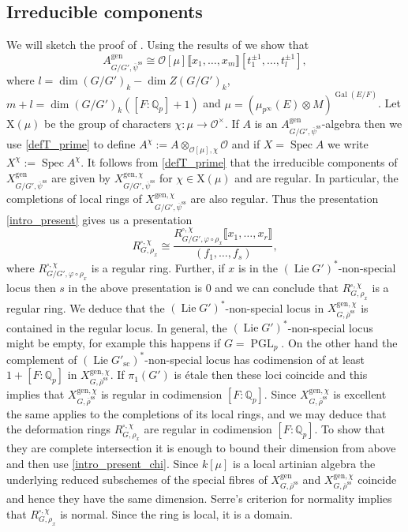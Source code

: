 \documentclass{amsart}
\theoremstyle{definition}
\theoremstyle{remark}
\DeclareMathOperator{\Gal}{Gal}
\DeclareMathOperator{\Spec}{Spec}
\newcommand{\Qp}{\mathbb {Q}_p}
\newcommand{\OO}{\mathcal O}
\newcommand{\br}[1]{\llbracket #1\rrbracket}
\newcommand{\rhobar}{\overline{\rho}}
\newcommand{\gen}{\mathrm{gen}}
\DeclareMathOperator{\PGL}{PGL}
\DeclareMathOperator{\Lie}{Lie}
\newcommand{\rhobarss}{\rhobar^{\mathrm{ss}}}
\newcommand{\psibar}{\overline{\psi}}
\newcommand{\psibarss}{\psibar^{\mathrm {ss}}}
\newcommand{\sic}{\operatorname{sc}}
\begin{document}
\subsection{Irreducible components} We will sketch the proof of . Using the results of \cite{defT} we show that 
\begin{equation}\label{defT_prime}
A^{\gen}_{G/G', \psibarss}\cong \OO[\mu]\br{x_1, \ldots, x_m}[t_1^{\pm 1}, \ldots, t_l^{\pm 1}],
\end{equation}
where $l= \dim (G/G')_k - \dim Z(G/G')_k$, $m+l= \dim (G/G')_k ([F:\Qp]+1)$ and $\mu=(\mu_{p^{\infty}}(E)\otimes M)^{\Gal(E/F)}$. 
Let $\mathrm{X}(\mu)$ be the group of characters $\chi: \mu \rightarrow \OO^{\times}$. If $A$ is an $A^{\gen}_{G/G', \psibarss}$-algebra
then we use \eqref{defT_prime} to define $A^{\chi}:= A\otimes_{\OO[\mu], \chi} \OO$ and if $X=\Spec A$ we write 
$X^{\chi}:=\Spec A^{\chi}$. It follows from \eqref{defT_prime} that the irreducible components of 
$X^{\gen}_{G/G', \psibarss}$ are given by $X^{\gen, \chi}_{G/G', \psibarss}$ for $\chi\in \mathrm X(\mu)$ and are
 regular. In particular, the completions of local rings of $X^{\gen, \chi}_{G/G', \psibarss}$ are also regular. Thus the presentation \eqref{intro_present}
 gives us a presentation
 \begin{equation}\label{intro_present_chi} 
R^{\square,\chi}_{G, \rho_x}\cong \frac{R^{\square,\chi}_{G/G', \varphi\circ \rho_x}\br{x_1, \ldots, x_r}}{(f_1,\ldots, f_s)},
\end{equation}
where $R^{\square,\chi}_{G/G', \varphi\circ \rho_x}$ is a regular ring. Further, if $x$ is in the $(\Lie G')^{\ast}$-non-special locus 
then $s$ in the above presentation is $0$ and we can conclude that $R^{\square,\chi}_{G, \rho_x}$ is a regular ring. We deduce that the $(\Lie G')^{\ast}$-non-special locus in $X^{\gen,\chi}_{G, \rhobarss}$ is contained in the 
regular locus. In general, 
the $(\Lie G')^{\ast}$-non-special locus might be empty, for example
this happens if $G=\PGL_p$. On the other hand the complement of $(\Lie G'_{\sic})^{\ast}$-non-special locus has codimension of at least $1+[F:\Qp]$ in $X^{\gen, \chi}_{G, \rhobarss}$. If $\pi_1(G')$ is \'etale then 
these loci coincide and this implies that  $X^{\gen,\chi}_{G, \rhobarss}$
is regular in codimension $[F:\Qp]$. Since $X^{\gen,\chi}_{G, \rhobarss}$ is excellent the same applies to 
the completions of its local rings, and we may deduce that the deformation rings $R^{\square,\chi}_{G, \rho_x}$ are regular 
in codimension $[F:\Qp]$. To show that they are complete intersection it is enough to bound their dimension from above and then 
use \eqref{intro_present_chi}. Since $k[\mu]$ is a local artinian algebra the underlying reduced subschemes of the special fibres of $X^{\gen}_{G, \rhobarss}$ 
and $X^{\gen, \chi}_{G, \rhobarss}$ coincide and hence they have the same dimension. Serre's criterion 
for normality implies that $R^{\square,\chi}_{G, \rho_x}$ is normal. Since the ring is local, it is a domain. 
\end{document}
